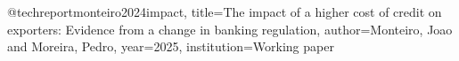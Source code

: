 @techreport{monteiro2024impact,
  title={The impact of a higher cost of credit on exporters: Evidence from a change in banking regulation},
  author={Monteiro, Joao and Moreira, Pedro},
  year={2025},
  institution={Working paper}
}
